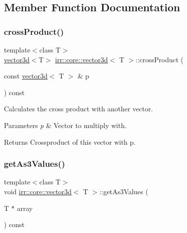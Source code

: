 \subsection{Member Function Documentation}
\mbox{\label{classirr_1_1core_1_1vector3d_a868da2be92d9b5c05858a17bc580ddd6}} 
\subsubsection{\texorpdfstring{cross\+Product()}{crossProduct()}}
{\footnotesize\ttfamily template$<$class T$>$ \\
\hyperlink{classirr_1_1core_1_1vector3d}{vector3d}$<$T$>$ \hyperlink{classirr_1_1core_1_1vector3d}{irr\+::core\+::vector3d}$<$ T $>$\+::cross\+Product (\begin{DoxyParamCaption}\item[{const \hyperlink{classirr_1_1core_1_1vector3d}{vector3d}$<$ T $>$ \&}]{p }\end{DoxyParamCaption}) const\hspace{0.3cm}{\ttfamily [inline]}}



Calculates the cross product with another vector. 


\begin{DoxyParams}{Parameters}
{\em p} & Vector to multiply with. \\
\hline
\end{DoxyParams}
\begin{DoxyReturn}{Returns}
Crossproduct of this vector with p. 
\end{DoxyReturn}
\mbox{\label{classirr_1_1core_1_1vector3d_af9e676bc10fe34e49e544373a33d7d21}} 
\subsubsection{\texorpdfstring{get\+As3\+Values()}{getAs3Values()}}
{\footnotesize\ttfamily template$<$class T$>$ \\
void \hyperlink{classirr_1_1core_1_1vector3d}{irr\+::core\+::vector3d}$<$ T $>$\+::get\+As3\+Values (\begin{DoxyParamCaption}\item[{T $\ast$}]{array }\end{DoxyParamCaption}) const\hspace{0.3cm}{\ttfamily [inline]}}



